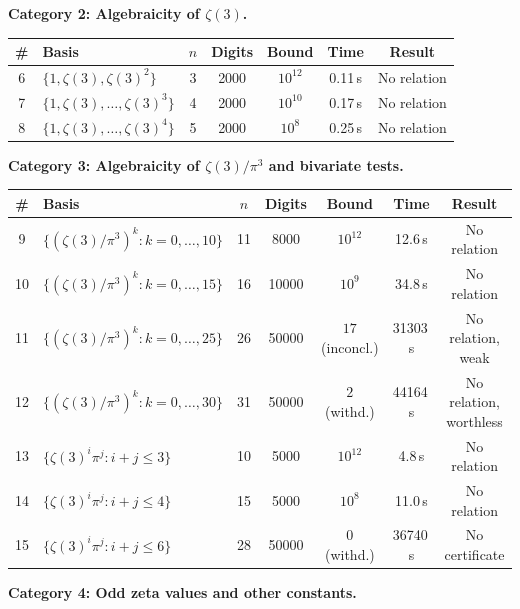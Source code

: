 \documentclass[12pt]{article}
\theoremstyle{definition}
\theoremstyle{remark}
\begin{document}
\medskip\noindent\textbf{Category 2: Algebraicity of $\zeta(3)$.}

\begin{center}
\begin{tabular}{@{}clccccc@{}}
\toprule
\# & Basis & $n$ & Digits & Bound & Time & Result \\
\midrule
6 & $\{1,\zeta(3),\zeta(3)^2\}$ & 3 & 2000 & $10^{12}$ & 0.11\,s & No relation \\
7 & $\{1,\zeta(3),\ldots,\zeta(3)^3\}$ & 4 & 2000 & $10^{10}$ & 0.17\,s & No relation \\
8 & $\{1,\zeta(3),\ldots,\zeta(3)^4\}$ & 5 & 2000 & $10^8$ & 0.25\,s & No relation \\
\bottomrule
\end{tabular}
\end{center}


\medskip\noindent\textbf{Category 3: Algebraicity of $\zeta(3)/\pi^3$
and bivariate tests.}

\begin{center}
\begin{tabular}{@{}clccccc@{}}
\toprule
\# & Basis & $n$ & Digits & Bound & Time & Result \\
\midrule
 9 & $\{(\zeta(3)/\pi^3)^k:k=0,\ldots,10\}$ & 11 & 8000 & $10^{12}$ & 12.6\,s & No relation \\
10 & $\{(\zeta(3)/\pi^3)^k:k=0,\ldots,15\}$ & 16 & 10000 & $10^{9}$ & 34.8\,s & No relation \\
11 & $\{(\zeta(3)/\pi^3)^k:k=0,\ldots,25\}$ & 26 & 50000 & $17$ (inconcl.) & 31303\,s & No relation, weak \\
12 & $\{(\zeta(3)/\pi^3)^k:k=0,\ldots,30\}$ & 31 & 50000 & $2$ (withd.) & 44164\,s & No relation, worthless \\
13 & $\{\zeta(3)^i\pi^j:i{+}j\le 3\}$ & 10 & 5000 & $10^{12}$ & 4.8\,s & No relation \\
14 & $\{\zeta(3)^i\pi^j:i{+}j\le 4\}$ & 15 & 5000 & $10^{8}$ & 11.0\,s & No relation \\
15 & $\{\zeta(3)^i\pi^j:i{+}j\le 6\}$ & 28 & 50000 & $0$ (withd.) & 36740\,s & No certificate \\
\bottomrule
\end{tabular}
\end{center}

\medskip\noindent\textbf{Category 4: Odd zeta values and other
constants.}
\end{document}
